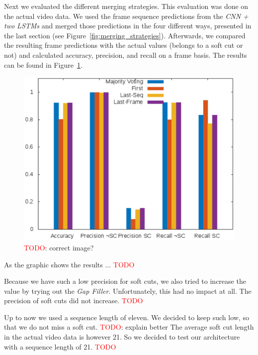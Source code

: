 Next we evaluated the different merging strategies.
This evaluation was done on the actual video data.
We used the frame sequence predictions from the \textit{CNN + two LSTMs} and merged those predictions in the four different ways, presented in the last section (see Figure~\ref{fig:merging_strategies}).
Afterwards, we compared the resulting frame predictions with the actual values (belongs to a soft cut or not) and calculated accuracy, precision, and recall on a frame basis. %
The results can be found in Figure~\ref{fig:evaluation_net}.
\begin{figure}[!htb]
	\centering
	\includegraphics[scale=.7]{images/evalutation_net.eps}
	\caption{\textcolor{red}{TODO}: correct image?}
	\label{fig:evaluation_net}
\end{figure}
As the graphic shows the results ... \textcolor{red}{TODO}

Because we have such a low precision for soft cuts, we also tried to increase the value by trying out the \textit{Gap Filler}.
Unfortunately, this had no impact at all.
The precision of soft cuts did not increase.
\textcolor{red}{TODO}

Up to now we used a sequence length of eleven.
We decided to keep such low, so that we do not miss a soft cut.
\textcolor{red}{TODO}: explain better
The average soft cut length in the actual video data is however 21.
So we decided to test our architecture with a sequence length of 21.
\textcolor{red}{TODO}


